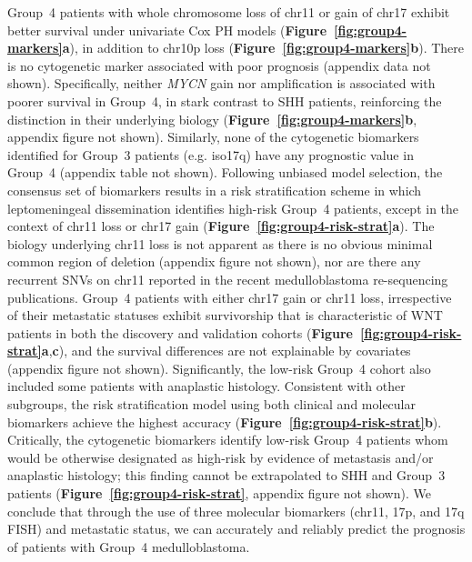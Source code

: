 \documentclass[11pt,letterpaper]{article}
\theoremstyle{definition}
\newcommand{\citefig}[1]{\textbf{Figure~\ref{fig:#1}}}
\begin{document}
Group~4 patients with whole chromosome loss of chr11 or gain of chr17 exhibit better survival under univariate Cox PH models (\citefig{group4-markers}\textbf{a}), in addition to chr10p loss (\citefig{group4-markers}\textbf{b}). There is no cytogenetic marker associated with poor prognosis (appendix data not shown). Specifically, neither \emph{MYCN} gain nor amplification is associated with poorer survival in Group~4, in stark contrast to SHH patients, reinforcing the distinction in their underlying biology (\citefig{group4-markers}\textbf{b}, appendix figure not shown). Similarly, none of the cytogenetic biomarkers identified for Group~3 patients (e.g. iso17q) have any prognostic value in Group~4 (appendix table not shown). Following unbiased model selection, the consensus set of biomarkers results in a risk stratification scheme in which leptomeningeal dissemination identifies high-risk Group~4 patients, except in the context of chr11 loss or chr17 gain (\citefig{group4-risk-strat}\textbf{a}). The biology underlying chr11 loss is not apparent as there is no obvious minimal common region of deletion (appendix figure not shown), nor are there any recurrent SNVs on chr11 reported in the recent medulloblastoma re-sequencing publications. Group~4 patients with either chr17 gain or chr11 loss, irrespective of their metastatic statuses exhibit survivorship that is characteristic of WNT patients in both the discovery and validation cohorts (\citefig{group4-risk-strat}\textbf{a},\textbf{c}), and the survival differences are not explainable by covariates (appendix figure not shown). Significantly, the low-risk Group~4 cohort also included some patients with anaplastic histology. Consistent with other subgroups, the risk stratification model using both clinical and molecular biomarkers achieve the highest accuracy (\citefig{group4-risk-strat}\textbf{b}). Critically, the cytogenetic biomarkers identify low-risk Group~4 patients whom would be otherwise designated as high-risk by evidence of metastasis and/or anaplastic histology; this finding cannot be extrapolated to SHH and Group~3 patients (\citefig{group4-risk-strat}, appendix figure not shown).  We conclude that through the use of three molecular biomarkers (chr11, 17p, and 17q FISH) and metastatic status, we can accurately and reliably predict the prognosis of patients with Group~4 medulloblastoma.
\end{document}
